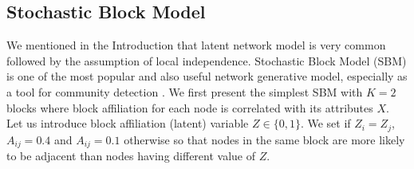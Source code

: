 \documentclass[12pt]{article}
\theoremstyle{definition}
\begin{document}
\subsection{Stochastic Block Model}

We mentioned in the Introduction that latent network model is very common followed by the assumption of local independence. Stochastic Block Model (SBM) is one of the most popular and also useful network generative model, especially as a tool for community detection \citep{karrer2011stochastic}. We first present the simplest SBM with $K = 2$ blocks where block affiliation for each node is correlated with its attributes $X$. Let us introduce block affiliation (latent) variable $Z \in \{ 0, 1 \}$. We set if $Z_{i}  = Z_{j}$, $A_{ij} = 0.4$ and $A_{ij} = 0.1$  otherwise so that nodes in the same block are more likely to be adjacent than nodes having different value of $Z$. 
	
\end{document}
